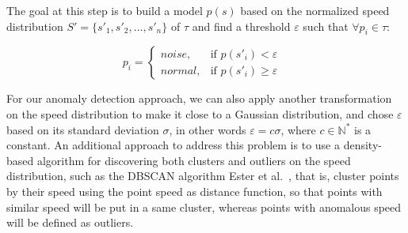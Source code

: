 \documentclass[a4paper,12pt]{article}
\begin{document}
The goal at this step is to build a model $p(s)$ based on the normalized speed distribution $S' = \{s'_1, s'_2, \dots, s'_n\}$ of $\tau$ and find a threshold $\varepsilon$ such that $\forall p_i \in \tau$: 

\[ p_i = \left\{ \begin{array}{ll}
	noise, & \mbox{if $p(s'_i)  < \varepsilon$ }\\
	normal, & \mbox{if $p(s'_i) \geq \varepsilon$}
\end{array} \right. \]

For our anomaly detection approach, we can also apply another transformation on the speed distribution to make it close to a Gaussian distribution, and chose $\varepsilon$ based on its standard deviation $\sigma$, in other words $\varepsilon = c\sigma$, where $c \in \mathbb{N^*}$ is a constant. An additional approach to address this problem is to use a density-based algorithm for discovering both clusters and outliers on the speed distribution, such as the DBSCAN algorithm Ester et al.~\cite{ester96}, that is, cluster points by their speed using the point speed as distance function, so that points with similar speed will be put in a same cluster, whereas points with anomalous speed will be defined as outliers.
\end{document}
